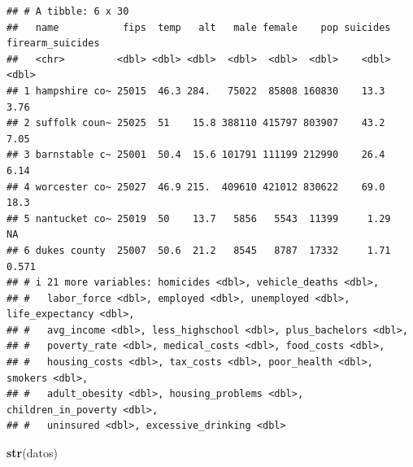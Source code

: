 \documentclass[
]{article}
\newenvironment{Shaded}{\begin{snugshade}}{\end{snugshade}}
\newcommand{\FunctionTok}[1]{\textcolor[rgb]{0.13,0.29,0.53}{\textbf{#1}}}
\newcommand{\NormalTok}[1]{#1}
\begin{document}
\begin{verbatim}
## # A tibble: 6 x 30
##   name           fips  temp   alt   male female    pop suicides firearm_suicides
##   <chr>         <dbl> <dbl> <dbl>  <dbl>  <dbl>  <dbl>    <dbl>            <dbl>
## 1 hampshire co~ 25015  46.3 284.   75022  85808 160830    13.3             3.76 
## 2 suffolk coun~ 25025  51    15.8 388110 415797 803907    43.2             7.05 
## 3 barnstable c~ 25001  50.4  15.6 101791 111199 212990    26.4             6.14 
## 4 worcester co~ 25027  46.9 215.  409610 421012 830622    69.0            18.3  
## 5 nantucket co~ 25019  50    13.7   5856   5543  11399     1.29           NA    
## 6 dukes county  25007  50.6  21.2   8545   8787  17332     1.71            0.571
## # i 21 more variables: homicides <dbl>, vehicle_deaths <dbl>,
## #   labor_force <dbl>, employed <dbl>, unemployed <dbl>, life_expectancy <dbl>,
## #   avg_income <dbl>, less_highschool <dbl>, plus_bachelors <dbl>,
## #   poverty_rate <dbl>, medical_costs <dbl>, food_costs <dbl>,
## #   housing_costs <dbl>, tax_costs <dbl>, poor_health <dbl>, smokers <dbl>,
## #   adult_obesity <dbl>, housing_problems <dbl>, children_in_poverty <dbl>,
## #   uninsured <dbl>, excessive_drinking <dbl>
\end{verbatim}

\begin{Shaded}
\begin{Highlighting}[]
\FunctionTok{str}\NormalTok{(datos)}
\end{Highlighting}
\end{Shaded}
\end{document}
